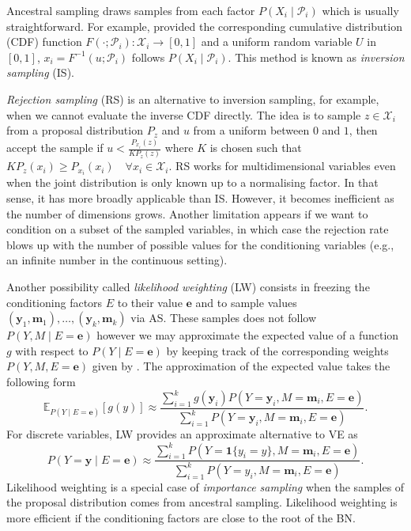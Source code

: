 Ancestral sampling draws samples from each factor $P(X_i\mid \mathcal{P}_i)$ which is usually straightforward. For example, provided the corresponding cumulative distribution (CDF) function $F(\cdot;\mathcal{P}_i): \mathcal{X}_i \rightarrow \left[0, 1 \right]$ and a uniform random variable $U$ in $\left[0, 1\right]$, $x_i=F^{-1}(u;\mathcal{P}_i)$ follows $P(X_i\mid \mathcal{P}_i)$. This method is known as \textit{inversion sampling} (IS).

\textit{Rejection sampling} (RS) is an alternative to inversion sampling, for example, when we cannot evaluate the inverse CDF directly. The idea is to sample $z \in \mathcal{X}_i$ from a proposal distribution $P_z$ and $u$ from a uniform between $0$ and $1$, then accept the sample if $u< \frac{P_{x_i}(z)}{K P_z(z)} $ where $K$ is chosen such that $ K P_z(x_i) \geq P_{x_i}(x_i) \quad \forall x_i \in \mathcal{X}_i$. RS works for multidimensional variables even when the joint distribution is only known up to a normalising factor. In that sense, it has more broadly applicable than IS. However, it becomes inefficient as the number of dimensions grows. Another limitation appears if we want to condition on a subset of the sampled variables, in which case the rejection rate blows up with the number of possible values for the conditioning variables (e.g., an infinite number in the continuous setting).

 Another possibility called \textit{likelihood weighting} (LW) consists in freezing the conditioning factors $E$ to their value $\bm{e}$ and to sample values $(\bm{y}_1, \bm{m}_1), \dots, (\bm{y}_k, \bm{m}_k)$ via AS. These samples does not follow $P(Y, M\mid E=\bm{e})$ however we may approximate the expected value of a function $g$ with respect to $P(Y\mid E=\bm{e})$ by keeping track of the corresponding weights $P(Y, M, E=\bm{e})$ given by . The approximation of the expected value takes the following form
$$ \mathbb{E}_{P(Y\mid E=\bm{e})}\left[g(y)\right] \approx \frac{\sum_{i=1}^k g(\bm{y}_i) P(Y=\bm{y}_i, M=\bm{m}_i, E=\bm{e})}{\sum_{i=1}^k P(Y=\bm{y}_i, M=\bm{m}_i, E=\bm{e}) }.$$ For discrete variables, LW provides an approximate alternative to VE as
 $$P(Y=\bm{y}\mid E=\bm{e}) \approx \frac{\sum_{i=1}^k P(Y=\bm{1}\{y_i = y\}, M=\bm{m}_i, E=\bm{e})}{\sum_{i=1}^k P(Y=y_i, M=\bm{m}_i, E=\bm{e})}. $$
Likelihood weighting is a special case of \textit{importance sampling} when the samples of the proposal distribution comes from ancestral sampling. Likelihood weighting is more efficient if the conditioning factors are close to the root of the BN.

